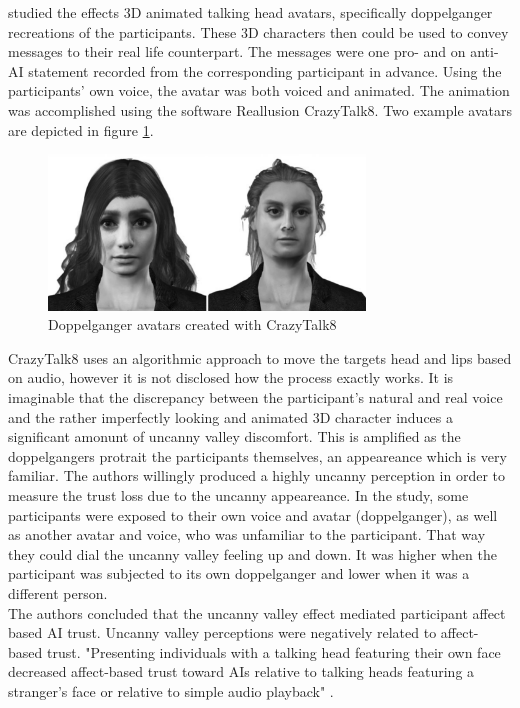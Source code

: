 \documentclass[
  a4paper,  %
  twoside,  %
  bibliography=totoc,
  headsepline,
  cleardoublepage=empty,
  parskip=half,
  draft=false
]{scrbook}
\begin{document}
 studied the effects 3D animated talking head avatars, specifically doppelganger recreations of the participants. These 3D characters then could be used to convey messages to their real life counterpart. The messages were one pro- and on anti-AI statement recorded from the corresponding participant in advance. Using the participants' own voice, the avatar was both voiced and animated. The animation was accomplished using the software Reallusion CrazyTalk8. Two example avatars are depicted in figure \ref{fig:uncanny-avatars}.
\begin{figure}[h]
  \centering
  \includegraphics[width=0.75\textwidth]{./graphics/images/uncanny-avatars.png}
  \caption{Doppelganger avatars created with CrazyTalk8 \cite{weismanFaceUncannyEffects2021}}
  \label{fig:uncanny-avatars}
\end{figure}
CrazyTalk8 uses an algorithmic approach to move the targets head and lips based on audio, however it is not disclosed how the process exactly works. It is imaginable that the discrepancy between the participant's natural and real voice and the rather imperfectly looking and animated 3D character induces a significant amonunt of uncanny valley discomfort. This is amplified as the doppelgangers protrait the participants themselves, an appeareance which is very familiar. The authors willingly produced a highly uncanny perception in order to measure the trust loss due to the uncanny appeareance. In the study, some participants were exposed to their own voice and avatar (doppelganger), as well as another avatar and voice, who was unfamiliar to the participant. That way they could dial the uncanny valley feeling up and down. It was higher when the participant was subjected to its own doppelganger and lower when it was a different person.\\
The authors concluded that the uncanny valley effect mediated participant affect based AI trust. Uncanny valley perceptions were negatively related to affect-based trust. "Presenting individuals with a talking head featuring their own face decreased affect-based trust toward AIs relative to talking heads featuring a stranger's face or relative to simple audio playback" \cite{weismanFaceUncannyEffects2021}. \\
\end{document}
